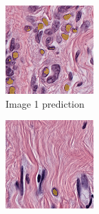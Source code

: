 \begin{figure}[H]
  \centering
  \begin{subfigure}[b]{0.32\textwidth}
    \centering
    \includegraphics[width=\linewidth]{assets/images/for_presentation/exp4-1-pred.png}
    \caption{Image 1 prediction}
  \end{subfigure}\hfill
  \begin{subfigure}[b]{0.32\textwidth}
    \centering
    \includegraphics[width=\linewidth]{assets/images/for_presentation/exp4-2-pred.png}

\end{subfigure}
\end{figure}
